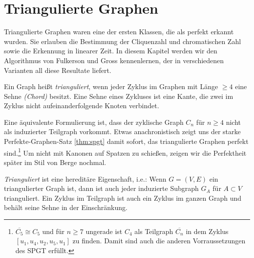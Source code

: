 \documentclass[../main.tex]{subfiles}
\begin{document}
\chapter{Triangulierte Graphen}
\label{chapter:trigulated}

Triangulierte Graphen waren eine der ersten Klassen, die als perfekt erkannt wurden. Sie erlauben die Bestimmung der Cliquenzahl und chromatischen Zahl sowie die Erkennung in linearer Zeit. In diesem Kapitel werden wir den Algorithmus von Fulkerson und Gross kennenlernen, der in verschiedenen Varianten all diese Resultate liefert.

\begin{definition}
    Ein Graph heißt \emph{trianguliert}, wenn jeder Zyklus im Graphen mit Länge $\geq 4$ eine Sehne \emph{(Chord)} besitzt. Eine Sehne eines Zykluses ist eine Kante, die zwei im Zyklus nicht aufeinanderfolgende Knoten verbindet.
\end{definition}

Eine äquivalente Formulierung ist, dass der zyklische Graph $C_n$ für $n\geq 4$ nicht als induzierter Teilgraph vorkommt. Etwas anachronistisch zeigt uns der starke Perfekte-Graphen-Satz \ref{thm:spgt} damit sofort, das triangulierte Graphen perfekt sind.\footnote{$\overline{C_5} \cong C_5$ und für $n \geq 7$ ungerade ist $C_4$ als Teilgraph $\overline{C_n}$ in dem Zyklus $[u_1, u_4, u_2, u_5, u_1]$ zu finden. Damit sind auch die anderen Vorraussetzungen des SPGT erfüllt.} Um nicht mit Kanonen auf Spatzen zu schießen, zeigen wir die Perfektheit später im Stil von Berge nochmal.

\emph{Trianguliert} ist eine hereditäre Eigenschaft, i.e.: Wenn $G = (V, E)$ ein triangulierter Graph ist, dann ist auch jeder induzierte Subgraph $G_A$ für $A \subset V$ trianguliert. Ein Zyklus im Teilgraph ist auch ein Zyklus im ganzen Graph und behält seine Sehne in der Einschränkung.
\end{document}
